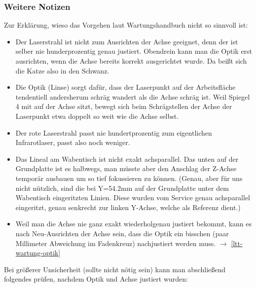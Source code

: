 \documentclass{\basedir/fablab-document}
\begin{document}
	\subsubsection*{Weitere Notizen}
	Zur Erklärung, wieso das Vorgehen laut Wartungshandbuch nicht so sinnvoll ist:
	\begin{itemize}
		\item Der Laserstrahl ist nicht zum Ausrichten der Achse geeignet, denn der ist selber nie hunderprozentig genau justiert. Obendrein kann man die Optik erst ausrichten, wenn die Achse bereits korrekt ausgerichtet wurde. Da beißt sich die Katze also in den Schwanz.

		\item Die Optik (Linse) sorgt dafür, dass der Laserpunkt auf der Arbeitsfläche tendentiell andersherum schräg wandert als die Achse schräg ist. Weil Spiegel 4 mit auf der Achse sitzt, bewegt sich beim Schrägstellen der Achse der Laserpunkt etwa doppelt so weit wie die Achse selbst.

		\item Der rote Laserstrahl passt nie hundertprozentig zum eigentlichen Infrarotlaser, passt also noch weniger.

		\item Das Lineal am Wabentisch ist nicht exakt achsparallel. Das unten auf der Grundplatte ist es halbwegs, man müsste aber den Anschlag der Z-Achse temporär ausbauen um so tief fokussieren zu können. (Genau, aber für uns nicht nützlich, sind die bei Y=54.2mm auf der Grundplatte unter dem Wabentisch eingeritzten Linien. Diese wurden vom Service genau achsparallel eingeritzt, genau senkrecht zur linken Y-Achse, welche als Referenz dient.)

		\item Weil man die Achse nie ganz exakt wiederholgenau justiert bekommt, kann es nach Neu-Ausrichten der Achse sein, dass die Optik ein bisschen (paar Millimeter Abweichung im Fadenkreuz) nachjustiert werden muss. $\rightarrow$ \cref{ltt-wartung-optik}
	\end{itemize}

	Bei größerer Unsicherheit (sollte nicht nötig sein) kann man abschließend folgendes prüfen, nachdem Optik und Achse justiert wurden:
\end{document}

